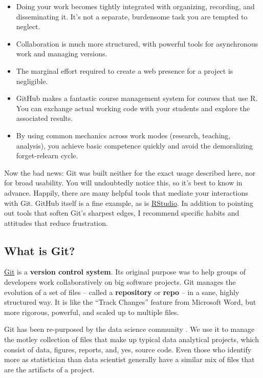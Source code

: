 \documentclass[12pt]{article}
\providecommand{\tightlist}{%
  \setlength{\itemsep}{0pt}\setlength{\parskip}{0pt}}
\begin{document}
\begin{itemize}
\tightlist
\item
  Doing your work becomes tightly integrated with organizing, recording,
  and disseminating it. It's not a separate, burdensome task you are
  tempted to neglect.
\item
  Collaboration is much more structured, with powerful tools for
  asynchronous work and managing versions.
\item
  The marginal effort required to create a web presence for a project is
  negligible.
\item
  GitHub makes a fantastic course management system for courses that use
  R. You can exchange actual working code with your students and explore
  the associated results.
\item
  By using common mechanics across work modes (research, teaching,
  analysis), you achieve basic competence quickly and avoid the
  demoralizing forget-relearn cycle.
\end{itemize}

Now the bad news: Git was built neither for the exact usage described
here, nor for broad usability. You will undoubtedly notice this, so it's
best to know in advance. Happily, there are many helpful tools that
mediate your interactions with Git. GitHub itself is a fine example, as
is \href{https://www.rstudio.com/products/rstudio/}{RStudio}. In
addition to pointing out tools that soften Git's sharpest edges, I
recommend specific habits and attitudes that reduce frustration.

\subsection{What is Git?}\label{what-is-git}

\href{http://git-scm.com}{Git} is a \textbf{version control system}. Its
original purpose was to help groups of developers work collaboratively
on big software projects. Git manages the evolution of a set of files --
called a \textbf{repository} or \textbf{repo} -- in a sane, highly
structured way. It is like the ``Track Changes'' feature from Microsoft
Word, but more rigorous, powerful, and scaled up to multiple files.

Git has been re-purposed by the data science community
\citep{Ram2013, git-for-humans, ten-simple-rules-git}. We use it to
manage the motley collection of files that make up typical data
analytical projects, which consist of data, figures, reports, and, yes,
source code. Even those who identify more as statistician than data
scientist generally have a similar mix of files that are the artifacts
of a project.
\end{document}
